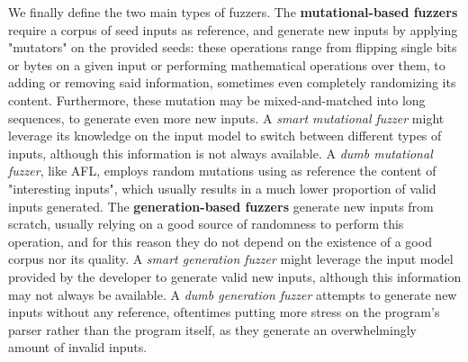 \newpage
We finally define the two main types of fuzzers.
\newline \newline
The \textbf{mutational-based fuzzers} require a corpus of seed inputs as reference, and generate new inputs by applying "mutators" on the provided seeds: these operations range from flipping single bits or bytes on a given input or performing mathematical operations over them, to adding or removing said information, sometimes even completely randomizing its content. Furthermore, these mutation may be mixed-and-matched into long sequences, to generate even more new inputs.
\newline
A \textit{smart mutational fuzzer} might leverage its knowledge on the input model to switch between different types of inputs, although this information is not always available.
\newline
A \textit{dumb mutational fuzzer}, like AFL, employs random mutations using as reference the content of "interesting inputs", which usually results in a much lower proportion of valid inputs generated.
\newline \newline
The \textbf{generation-based fuzzers} generate new inputs from scratch, usually relying on a good source of randomness to perform this operation, and for this reason they do not depend on the existence of a good corpus nor its quality.
\newline
A \textit{smart generation fuzzer} might leverage the input model provided by the developer to generate valid new inputs, although this information may not always be available.
\newline
A \textit{dumb generation fuzzer} attempts to generate new inputs without any reference, oftentimes putting more stress on the program's parser rather than the program itself, as they generate an overwhelmingly amount of invalid inputs.


\newpage
